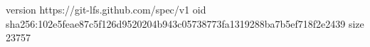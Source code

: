 version https://git-lfs.github.com/spec/v1
oid sha256:102e5feae87c5f126d9520204b943c05738773fa1319288ba7b5ef718f2e2439
size 23757

